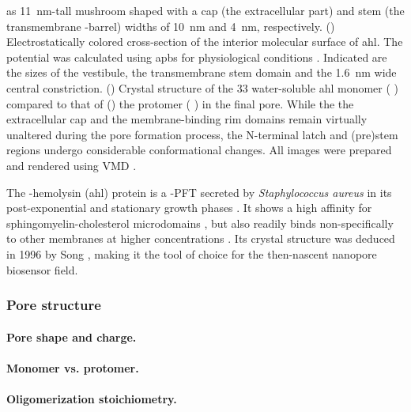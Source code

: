 \begin{figure*}[p]
{  as \SI{11}{\nm}-tall mushroom shaped with a cap (\ie the extracellular part) and stem (\ie the transmembrane
  \tb-barrel) widths of \SI{10}{\nm} and \SI{4}{\nm}, respectively.
  ()
  Electrostatically colored cross-section of the interior molecular surface of \gls{ahl}. The potential was
  calculated using \gls{apbs} for physiological conditions \cite{Baker-2001,Baker-2005}. Indicated are the
  sizes of the \cisi{} vestibule, the transmembrane stem domain and the \SI{1.6}{\nm} wide central
  constriction.
  ()
  Crystal structure of the \SI{33}{\kDa} water-soluble \gls{ahl} monomer ( \cite{Sugawara-2015})
  compared to that of
  ()
  the protomer ( \cite{Song-1996}) in the final pore. While the the extracellular cap and the
  membrane-binding rim domains remain virtually unaltered during the pore formation process, the N-terminal
  latch and (pre)stem regions undergo considerable conformational changes. 
  All images were prepared and rendered using VMD \cite{Humphrey-1996,Stone-1998}.
  }\label{fig:ahl_pore_structure}
\end{figure*}

The \textalpha-hemolysin (\gls{ahl}) protein is a \tb-\gls{PFT} secreted by \textit{Staphylococcus aureus} in
its post-exponential and stationary growth phases \cite{Bhakdi-1991}. It shows a high affinity for
sphingomyelin-cholesterol microdomains \cite{Menestrina-2001,Valeva-2006}, but also readily binds
non-specifically to other membranes at higher concentrations \cite{Hildebrand-1991}. Its crystal structure was
deduced in 1996 by Song \etal{} \cite{Song-1996}, making it the tool of choice for the then-nascent nanopore
biosensor field. 

\subsubsection{Pore structure}

\paragraph{Pore shape and charge.}
%

\paragraph{Monomer vs. protomer.}
%

\paragraph{Oligomerization stoichiometry.}
%


